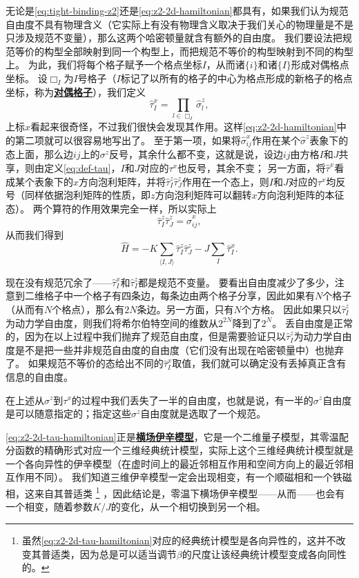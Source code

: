 \documentclass[hyperref, UTF8, a4paper]{ctexart}
\newcommand*{\pair}[1]{\langle #1 \rangle}
\newcommand*{\concept}[1]{\underline{\textbf{#1}}}
\newcommand*{\Ztwo}{$\mathbb{Z}_2$}
\begin{document}
无论是\eqref{eq:tight-binding-z2}还是\eqref{eq:z2-2d-hamiltonian}都具有，如果我们认为规范自由度不具有物理含义（它实际上有没有物理含义取决于我们关心的物理量是不是只涉及规范不变量），那么这两个哈密顿量就含有额外的自由度。
我们要设法把规范等价的构型全部映射到同一个构型上，而把规范不等价的构型映射到不同的构型上。
为此，我们将每个格子赋予一个格点坐标$I$，从而诸$\{i\}$和诸$\{I\}$形成对偶格点坐标。
设$\Box_I$为$I$号格子（$I$标记了以所有的格子的中心为格点形成的新格子的格点坐标，称为\concept{对偶格子}），我们定义
\begin{equation}
    \hat{\tau}^x_I = \prod_{l \in \Box_I} \hat{\sigma}^z_l,
    \label{eq:def-tau}
\end{equation}
上标$x$看起来很奇怪，不过我们很快会发现其作用。这样\eqref{eq:z2-2d-hamiltonian}中的第二项就可以很容易地写出了。
至于第一项，如果将$\hat{\sigma}_{ij}^x$作用在某个$\hat{\sigma}^z$表象下的态上面，那么边$ij$上的$\sigma^z$反号，其余什么都不变，这就是说，设边$ij$由方格$I$和$J$共享，则由定义\eqref{eq:def-tau}，$I$和$J$对应的$\tau^x$也反号，其余不变；
另一方面，将$\hat{\tau}^x$看成某个表象下的$x$方向泡利矩阵，并将$\hat{\tau}^z_I \hat{\tau}^z_J$作用在一个态上，则$I$和$J$对应的$\tau^x$均反号（同样依据泡利矩阵的性质，即$z$方向泡利矩阵可以翻转$x$方向泡利矩阵的本征态）。
两个算符的作用效果完全一样，所以实际上
\[
    \hat{\tau}^z_I \hat{\tau}^z_J = \hat{\sigma}^x_{ij},
\]
从而我们得到
\begin{equation}
    \hat{H} = - K \sum_{\pair{I, J}} \hat{\tau}^z_I \hat{\tau}^z_J - J \sum_{I} \hat{\tau}^x_I.
    \label{eq:z2-2d-tau-hamiltonian}
\end{equation}

现在没有规范冗余了——$\hat{\tau}^x_{I}$和$\hat{\tau}^z_I$都是规范不变量。
要看出自由度减少了多少，注意到二维格子中一个格子有四条边，每条边由两个格子分享，因此如果有$N$个格子（从而有$N$个格点），那么有$2N$条边。另一方面，只有$N$个方格。
因此如果只以$\hat{\tau}^z_I$为动力学自由度，则我们将希尔伯特空间的维数从$2^{2N}$降到了$2^N$。
丢自由度是正常的，因为在以上过程中我们抛弃了规范自由度，但是需要验证只以$\hat{\tau}^z_I$为动力学自由度是不是把一些并非规范自由度的自由度（它们没有出现在哈密顿量中）也抛弃了。
如果规范不等价的态给出不同的$\hat{\tau}^x_I$取值，我们就可以确定没有丢掉真正含有信息的自由度。

在上述从$\sigma^z$到$\tau^x$的过程中我们丢失了一半的自由度，也就是说，有一半的$\sigma^z$自由度是可以随意指定的；指定这些$\sigma^z$自由度就是选取了一个规范。

\eqref{eq:z2-2d-tau-hamiltonian}正是\concept{横场伊辛模型}，它是一个二维量子模型，其零温配分函数的精确形式对应一个三维经典统计模型，实际上这个三维经典统计模型就是一个各向异性的伊辛模型（在虚时间上的最近邻相互作用和空间方向上的最近邻相互作用不同）。
我们知道三维伊辛模型一定会出现相变，有一个顺磁相和一个铁磁相，这来自其普适类%
\footnote{
    虽然\eqref{eq:z2-2d-tau-hamiltonian}对应的经典统计模型是各向异性的，这并不改变其普适类，因为总是可以适当调节$\beta$的尺度让该经典统计模型变成各向同性的。
}%
，因此结论是，零温下横场伊辛模型——从而——也会有一个相变，随着参数$K / J$的变化，从一个相切换到另一个相。
\end{document}
